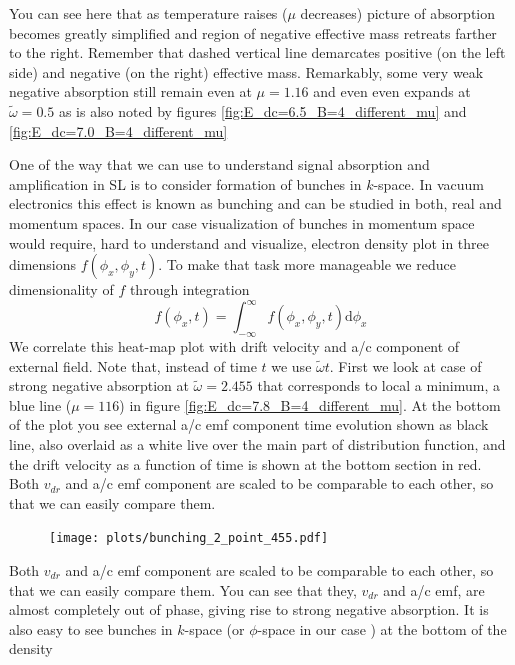 \documentclass[40pt,letterpaper,physrev]{article}
\begin{document}
    You can see here that as temperature raises ($\mu$ decreases) picture of absorption becomes greatly simplified and 
    region of negative effective mass retreats farther to the right. Remember that dashed vertical line demarcates 
    positive (on the left side) and negative (on the right) effective mass. Remarkably, some very weak negative absorption 
    still remain even at $\mu=1.16$ and even even expands at $\tilde{\omega}=0.5$ as is also noted by figures 
    \ref{fig:E_dc=6.5_B=4_different_mu} and \ref{fig:E_dc=7.0_B=4_different_mu}
    
    One of the way that we can use to understand signal absorption and amplification in SL is to consider formation
    of bunches in $k$-space. In vacuum electronics this effect is known as bunching and can be studied in both, real and
    momentum spaces. In our case visualization of bunches in momentum space would require, hard to understand and
    visualize, electron density plot in three dimensions $f(\phi_x, \phi_y, t)$. To make that task more manageable we
    reduce dimensionality of $f$ through integration
    \begin{equation}
        f(\phi_x,t)=\int^{\infty}_{-\infty}f(\phi_x,\phi_y,t)\text{d}\phi_x
    \end{equation}
    We correlate this heat-map plot with drift velocity and a/c component of external field. Note that, instead of time 
    $t$ we use $\tilde{\omega}t$. First we look at case of strong negative absorption at $\tilde{\omega} = 2.455$ that
    corresponds to local a minimum, a blue line ($\mu = 116$) in figure \ref{fig:E_dc=7.8_B=4_different_mu}. At the
    bottom of the plot you see external a/c emf component time evolution shown as black line, also overlaid as a white
    live over the main part of distribution function, and the drift velocity as a function of time is shown at the bottom
    section in red. Both $v_{dr}$ and a/c emf component are scaled to be comparable to each other, so that we can easily
    compare them.
	\begin{figure}[H]
	  \centering
	  \normalsize %
	  \texttt{[image: plots/bunching\_2\_point\_455.pdf]}
	  \caption{}	  
	\end{figure}
	Both $v_{dr}$ and a/c emf component are scaled to be comparable to each other, so that we can easily compare them.
	You can see that they, $v_{dr}$ and a/c emf, are almost completely out of phase, giving rise to strong negative
	absorption. It is also easy to see bunches in $k$-space (or $\phi$-space in our case ) at the bottom of the density
\end{document}

